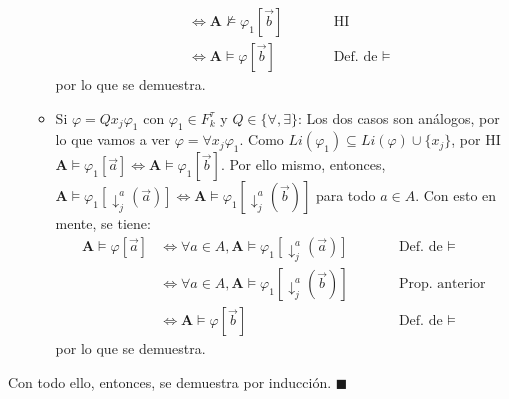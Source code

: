 \documentclass{article}
\begin{document}
\begin{itemize}
\begin{itemize}
\begin{equation*}
\begin{alignedat}{2}
                                                     & \iff \mathbf{A}\nvDash\varphi_1[\vec{b}] &  & \qquad\text{HI}             \\
                                                     & \iff \mathbf{A}\vDash\varphi[\vec{b}]    &  & \qquad\text{Def. de }\vDash
                  \end{alignedat}
                \end{equation*}
                por lo que se demuestra.
          \item Si $\varphi=Qx_j\varphi_1$ con $\varphi_1\in F^\tau_k$ y $Q\in\{\forall,\exists\}$: Los dos casos son análogos, por lo que vamos a ver $\varphi=\forall x_j\varphi_1$. Como $Li(\varphi_1)\subseteq Li(\varphi)\cup\{x_j\}$, por HI $\mathbf{A}\vDash\varphi_1[\vec{a}]\iff\mathbf{A}\vDash\varphi_1[\vec{b}]$. Por ello mismo, entonces, $\mathbf{A}\vDash\varphi_1[\downarrow^a_j(\vec{a})]\iff\mathbf{A}\vDash\varphi_1[\downarrow^a_j(\vec{b})]$ para todo $a\in A$. Con esto en mente, se tiene:
                \begin{equation*}
                  \begin{alignedat}{2}
                    \mathbf{A}\vDash\varphi[\vec{a}] & \iff \forall a\in A,\mathbf{A}\vDash\varphi_1[\downarrow^a_j(\vec{a})] &  & \qquad\text{Def. de }\vDash \\
                                                     & \iff \forall a\in A,\mathbf{A}\vDash\varphi_1[\downarrow^a_j(\vec{b})] &  & \qquad\text{Prop. anterior} \\
                                                     & \iff \mathbf{A}\vDash\varphi[\vec{b}]                                  &  & \qquad\text{Def. de }\vDash
                  \end{alignedat}
                \end{equation*}
                por lo que se demuestra.
        \end{itemize}
\end{itemize}

Con todo ello, entonces, se demuestra por inducción. $\blacksquare$
\end{document}
